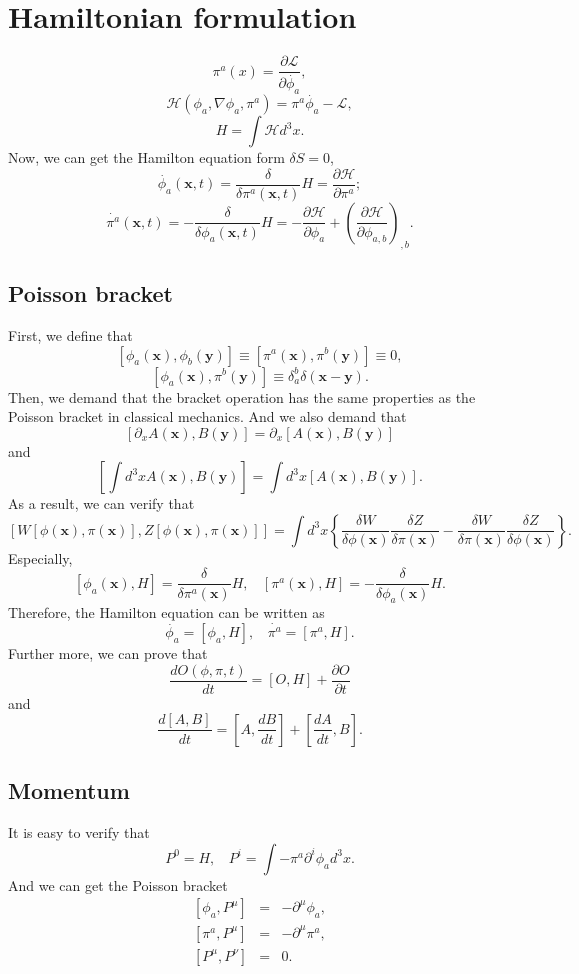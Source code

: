 \section{Hamiltonian formulation}
\[\pi^a(x) = \frac{\partial \mathcal{L}}{\partial \dot{\phi_a}},\]
\[\mathcal{H}(\phi_a,\nabla \phi_a,\pi^a) = \pi^a \dot{\phi_a} - \mathcal{L},\]
\[H = \int \mathcal{H} d^3 x.\]
Now, we can get the Hamilton equation form $\delta S =0$,
\[\dot{\phi_a}(\bm{x},t) = \frac{\delta}{\delta \pi^a(\bm{x},t)} H = \frac{\partial \mathcal{H}}{\partial \pi^a};\]
\[\dot{\pi^a}(\bm{x},t) = -\frac{\delta}{\delta \phi_a(\bm{x},t)} H = - \frac{\partial \mathcal{H}}{\partial \phi_a} + \left(\frac{\partial \mathcal{H}}{\partial \phi_{a,b}}\right)_{,b}.\]

\subsection{Poisson bracket}

First, we define that
\[[\phi_a(\bm{x}),\phi_b(\bm{y})] \equiv [\pi^a(\bm{x}),\pi^b(\bm{y})] \equiv 0,\]
\[[\phi_a(\bm{x}),\pi^b(\bm{y})] \equiv \delta^{b}_{a} \delta(\bm{x}-\bm{y}).\]
Then, we demand that the bracket operation has the same properties as the Poisson bracket in classical mechanics. And we also demand that
\[[\partial_x A(\bm{x}),B(\bm{y})] = \partial_x [A(\bm{x}),B(\bm{y})]\]
and
\[\left[\int d^3 x A(\bm{x}),B(\bm{y})\right] = \int d^3 x [A(\bm{x}),B(\bm{y})].\]
As a result, we can verify that
\[[W[\phi(\bm{x}),\pi(\bm{x})],Z[\phi(\bm{x}),\pi(\bm{x})]] = \int d^3x \left\{ \frac{\delta W}{\delta \phi(\bm{x})} \frac{\delta Z}{\delta \pi(\bm{x})} - \frac{\delta W}{\delta \pi(\bm{x})} \frac{\delta Z}{\delta \phi(\bm{x})} \right\}.\]
Especially,
\[[\phi_a(\bm{x}),H] = \frac{\delta }{\delta \pi^a(\bm{x})} H, \ \ \ \ [\pi^a(\bm{x}),H] = -\frac{\delta }{\delta \phi_a(\bm{x})} H.\]
Therefore, the Hamilton equation can be written as
\[\dot{\phi_a} = [\phi_a,H], \ \ \ \ \dot{\pi^a} = [\pi^a,H].\]
Further more, we can prove that
\[\frac{dO(\phi,\pi,t)}{dt} = [O,H] + \frac{\partial O}{\partial t} \]
and
\[\frac{d[A,B]}{dt} = [A,\frac{dB}{dt}] + [\frac{dA}{dt},B]  .\]

\subsection{Momentum}

It is easy to verify that
\[P^{0} = H, \ \ \ \ P^{i} = \int -\pi^a \partial^i \phi_a d^3 x.\]
And we can get the Poisson bracket
\begin{eqnarray}
	\left[\phi_a,P^{\mu}\right] &=& -\partial^{\mu} \phi_a, \nonumber \\
	\left[\pi^a,P^{\mu}\right] &=& -\partial^{\mu} \pi^a, \nonumber \\
	\left[P^{\mu},P^{\nu}\right] &=& 0 .\nonumber 
\end{eqnarray}

